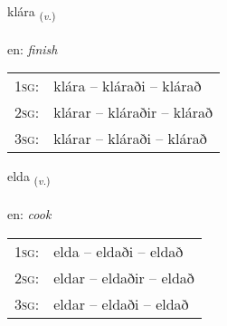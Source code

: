 \documentclass[frontgrid, backgrid]{flacards}\usepackage[]{graphicx}\usepackage[]{color}
\begin{document}
\renewcommand{\flhead}{\vskip5pt \fboxsep=0pt {\small\bfseries\footnotesize Sagnorð | Verb}}
\renewcommand{\fcfoot}{\vskip5pt \fboxsep=0pt \hspace{2pt}{\small\bfseries\footnotesize 2K}}

\renewcommand{\blhead}{\vskip5pt {\small\bfseries\footnotesize Sagnorð | Verb }}
\renewcommand{\bcfoot}{\vskip5pt \hspace{2pt}{\small\bfseries\footnotesize 2K}}


{klára \small{\textsubscript{(\textit{v.})}} \\[1ex] %
\textphonetic{[kʰlauːra]} \\
en: \emph{finish} \\  [2ex]
\renewcommand*{\arraystretch}{0.8}
\begin{tabular}{p{1cm}l}
\textsc{1sg}: & klára -- kláraði -- klárað \\ 
\textsc{2sg}: & klárar -- kláraðir -- klárað \\ 
\textsc{3sg}: & klárar -- kláraði -- klárað \\ 
\end{tabular}
}

\renewcommand{\flhead}{\vskip5pt \fboxsep=0pt {\small\bfseries\footnotesize Sagnorð | Verb}}
\renewcommand{\fcfoot}{\vskip5pt \fboxsep=0pt \hspace{2pt}{\small\bfseries\footnotesize 2K}}

\renewcommand{\blhead}{\vskip5pt {\small\bfseries\footnotesize Sagnorð | Verb }}
\renewcommand{\bcfoot}{\vskip5pt \hspace{2pt}{\small\bfseries\footnotesize 2K}}


{elda \small{\textsubscript{(\textit{v.})}} \\[1ex] %
\textphonetic{[ɛlta]} \\
en: \emph{cook} \\  [2ex]
\renewcommand*{\arraystretch}{0.8}
\begin{tabular}{p{1cm}l}
\textsc{1sg}: & elda -- eldaði -- eldað \\ 
\textsc{2sg}: & eldar -- eldaðir -- eldað \\ 
\textsc{3sg}: & eldar -- eldaði -- eldað \\ 
\end{tabular}
}
\end{document}
